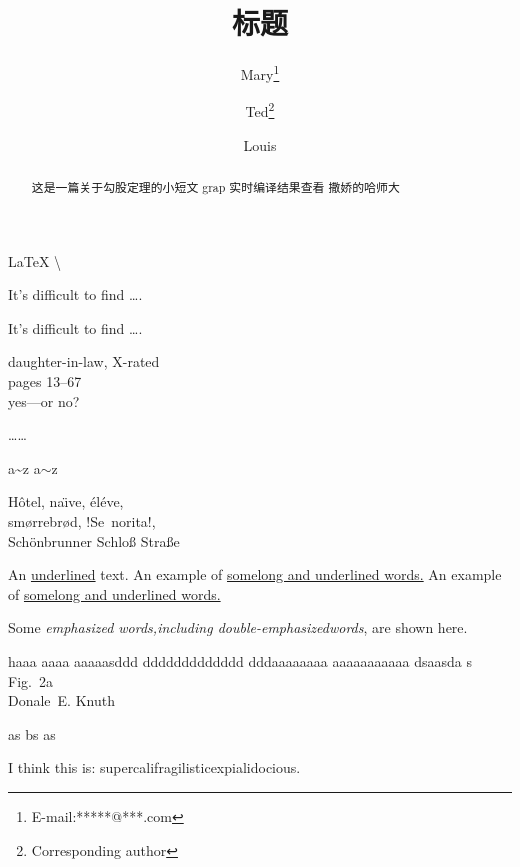 \documentclass{article}
\title{标题}
\author{Mary\thanks{E-mail:*****@***.com}\and Ted\thanks{Corresponding author}\and Louis}
\begin{document}
    \maketitle
    
    \begin{abstract}
		这是一篇关于勾股定理的小短文
		grap
		实时编译结果查看
		撒娇的哈师大
	\end{abstract}
	\LaTeX
    \textbackslash      %
    \par
    It’s difficult to find \ldots .
    \par 
    It’s dif{}f{}icult to f{}ind \ldots .   %

    \par 
    daughter-in-law, X-rated\\
    pages 13--67\\
    yes---or no?

    \par 
    \ldots  \dots

    \par 
    a\~{}z \qquad a$\sim$z

    \par 
    H\^otel, na\"\i ve, \'el\'{e}ve,\\
    sm\o rrebr\o d, !Se\ norita!,\\
    Sch\"onbrunner Schlo\ss{}
    Stra\ss e

    \par 
    An \underline{underlined} text.
    An example of \underline{somelong and underlined words.}
    An example of \uline{somelong and underlined words.}

    \par 
    Some \emph{emphasized words,including \emph{double-emphasized}words}, are shown here.

    \par 
    haaa aaaa aaaaasddd ddddddddddddd dddaaaaaaaa aaaaaaaaaaa  dsaasda s 
    Fig.~2a \\  %
    \newline    %
    Donale~E. Knuth

    \newpage
    as 
    \linebreak[3]
    bs
    \clearpage
    as

    \par
    I think this is: su\-per\-cal\-i\-frag\-i\-lis\-tic\-ex\-pi\-al\-i\-do\-cious.
\end{document}
